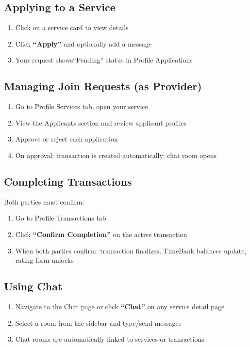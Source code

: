 \documentclass[11pt,a4paper]{report}
\begin{document}
\subsection{Applying to a Service}

\begin{enumerate}
    \item Click on a service card to view details
    \item Click \textbf{``Apply''} and optionally add a message
    \item Your request shows``Pending'' status in Profile \textrightarrow{} Applications
\end{enumerate}

\subsection{Managing Join Requests (as Provider)}

\begin{enumerate}
    \item Go to Profile \textrightarrow{} Services tab, open your service
    \item View the Applicants section and review applicant profiles
    \item Approve or reject each application
    \item On approval: transaction is created automatically; chat room opens
\end{enumerate}

\subsection{Completing Transactions}

Both parties must confirm:

\begin{enumerate}
    \item Go to Profile \textrightarrow{} Transactions tab
    \item Click \textbf{``Confirm Completion''} on the active transaction
    \item When both parties confirm: transaction finalizes, TimeBank balances update, rating form unlocks
\end{enumerate}

\subsection{Using Chat}

\begin{enumerate}
    \item Navigate to the Chat page or click \textbf{``Chat''} on any service detail page
    \item Select a room from the sidebar and type/send messages
    \item Chat rooms are automatically linked to services or transactions
\end{enumerate}
\end{document}
